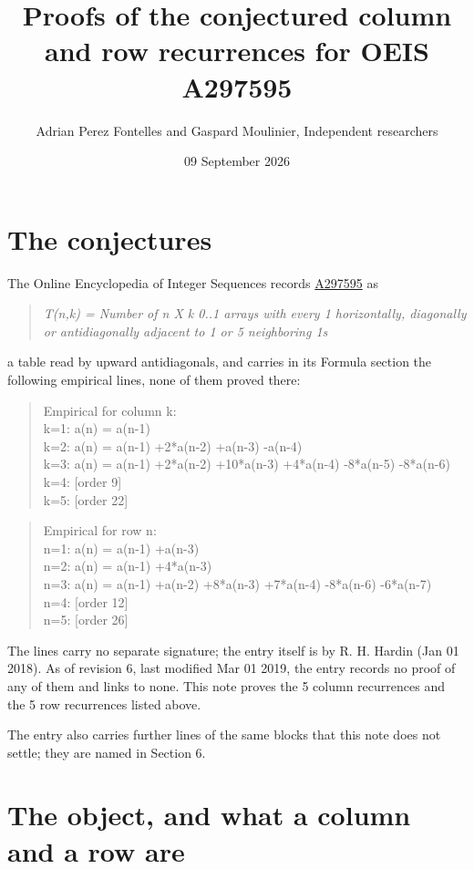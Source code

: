 \documentclass[11pt]{article}
\title{Proofs of the conjectured column and row recurrences for OEIS A297595}
\author{Adrian Perez Fontelles and Gaspard Moulinier, Independent researchers}
\date{09 September 2026}
\theoremstyle{definition}
\begin{document}
\maketitle
\section{The conjectures}

The Online Encyclopedia of Integer Sequences records \href{https://oeis.org/A297595}{A297595} as

\begin{quote}\itshape T(n,k) = Number of n X k 0..1 arrays with every 1 horizontally, diagonally or antidiagonally adjacent to 1 or 5 neighboring 1s\end{quote}

a table read by upward antidiagonals, and carries in its Formula section the following empirical lines, none of them proved there:

\begin{quote}\ttfamily Empirical for column k:\\
k=1: a(n) = a(n-1)\\k=2: a(n) = a(n-1) +2*a(n-2) +a(n-3) -a(n-4)\\k=3: a(n) = a(n-1) +2*a(n-2) +10*a(n-3) +4*a(n-4) -8*a(n-5) -8*a(n-6)\\k=4: [order 9]\\k=5: [order 22]\end{quote}

\begin{quote}\ttfamily Empirical for row n:\\
n=1: a(n) = a(n-1) +a(n-3)\\n=2: a(n) = a(n-1) +4*a(n-3)\\n=3: a(n) = a(n-1) +a(n-2) +8*a(n-3) +7*a(n-4) -8*a(n-6) -6*a(n-7)\\n=4: [order 12]\\n=5: [order 26]\end{quote}

The lines carry no separate signature; the entry itself is by R. H. Hardin (Jan 01 2018). As of revision 6, last modified Mar 01 2019, the entry records no proof of any of them and links to none. This note proves the 5 column recurrences and the 5 row recurrences listed above.

The entry also carries further lines of the same blocks that this note does not settle; they are named in Section 6.

\section{The object, and what a column and a row are}
\end{document}
